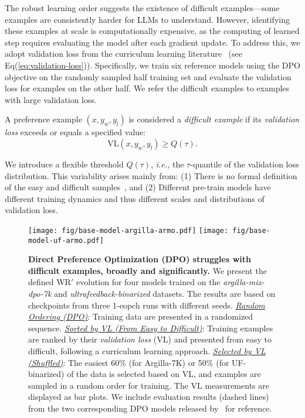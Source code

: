 The robust learning order suggests the existence of difficult examples---some examples are consistently harder for LLMs to understand.  
However, identifying these examples at scale is computationally expensive, as the computing of learned step requires evaluating the model after each gradient update. To address this, we adopt validation loss from the curriculum learning literature~\cite{wucurricula,rampp2024does} (see Eq(\ref{eq:validation-loss})). Specifically, we train six reference models using the DPO objective on the randomly sampled half training set and evaluate the validation loss for examples on the other half.
We refer the difficult examples to examples with large validation loss.

\begin{definition}
    \label{def:difficult-example}
    A preference example $(x, y_w, y_l)$ is considered a \textit{difficult example} if its \textit{validation loss} exceeds or equals a specified value: $$\text{VL}(x, y_w, y_l) \geq Q(\tau).$$ 
\end{definition}

\begin{remark}
    We introduce a flexible threshold $Q(\tau)$, \textit{i.e.,} the $\tau$-quantile of the validation loss distribution. This variability arises mainly from: (1) There is no formal definition of the easy and difficult samples~\cite{zhu2024exploring}, and (2) Different pre-train models have different training dynamics and thus different scales and distributions of validation loss. 
\end{remark}

\begin{figure*}
    \centering
    \texttt{[image: fig/base-model-argilla-armo.pdf]}\vspace{-0.1cm}
    \texttt{[image: fig/base-model-uf-armo.pdf]}
    \vspace{-0.4cm}
    \caption{
    \textbf{Direct Preference Optimization (DPO) struggles with difficult examples, broadly and significantly.} We present the defined WR$'$ evolution for four models trained on the \textit{argilla-mix-dpo-7k} and \textit{ultrafeedback-binarized} datasets. The results are based on checkpoints from three 1-eopch runs with different seeds. 
    \textit{\underline{Random Ordering (DPO)}}: Training data are presented in a randomized sequence. 
    \textit{\underline{Sorted by VL (From Easy to Difficult)}}: Training examples are ranked by their \textit{validation loss} (VL) and presented from easy to difficult, following a curriculum learning approach. 
    \textit{\underline{Selected by VL (Shuffled)}}: The easiest 60\% (for Argilla-7K) or 50\% (for UF-binarized) of the data is selected based on VL, and examples are sampled in a random order for training. The VL measurements are displayed as bar plots. We include evaluation results (dashed lines) from the two corresponding DPO models released by~\citet{meng2024simpo} for reference.
    }
    \label{fig:base-model-struggles}
\end{figure*}



